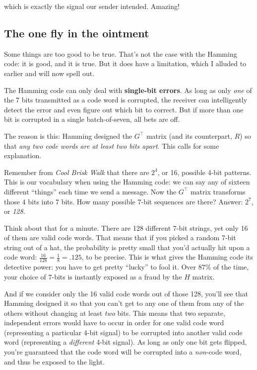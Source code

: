 \begin{alttitles}
which is exactly the signal our sender intended. Amazing!

\subsection{The one fly in the ointment}

Some things are too good to be true. That's not the case with the Hamming code:
it is good, and it is true. But it does have a limitation, which I alluded to
earlier and will now spell out.


The Hamming code can only deal with \textbf{single-bit errors}. As long as only
\textit{one} of the 7 bits transmitted as a code word is corrupted, the
receiver can intelligently detect the error and even figure out which bit to
correct. But if more than one bit is corrupted in a single batch-of-seven, all
bets are off.

The reason is this: Hamming designed the $G^\intercal$ matrix (and its
counterpart, $R$) so that \textit{any two code words are at least two bits
apart}. This calls for some explanation.

Remember from \textit{Cool Brisk Walk} that there are $2^{4}$, or 16, possible
4-bit patterns. This is our vocabulary when using the Hamming code: we can say
any of sixteen different ``things'' each time we send a message. Now the
$G^\intercal$ matrix transforms those 4 bits into 7 bits. How many possible
7-bit sequences are there? Answer: $2^7$, or \textit{128.}

Think about that for a minute. There are 128 different 7-bit strings, yet only
16 of them are valid code words. That means that if you picked a random 7-bit
string out of a hat, the probability is pretty small that you'd actually hit
upon a code word: $\frac{16}{128} = \frac{1}{8} = .125$, to be precise. This is
what gives the Hamming code its detective power: you have to get pretty
``lucky'' to fool it. Over $87\%$ of the time, your choice of 7-bits is
instantly exposed as a fraud by the $H$ matrix.

And if we consider only the 16 valid code words out of those 128, you'll see
that Hamming designed it so that you can't get to any one of them from any of
the others without changing at least \textit{two} bits. This means that two
separate, independent errors would have to occur in order for one valid code
word (representing a particular 4-bit signal) to be corrupted into another
valid code word (representing a \textit{different} 4-bit signal). As long as
only one bit gets flipped, you're guaranteed that the code word will be
corrupted into a \textit{non}-code word, and thus be exposed to the light.


\end{alttitles}
